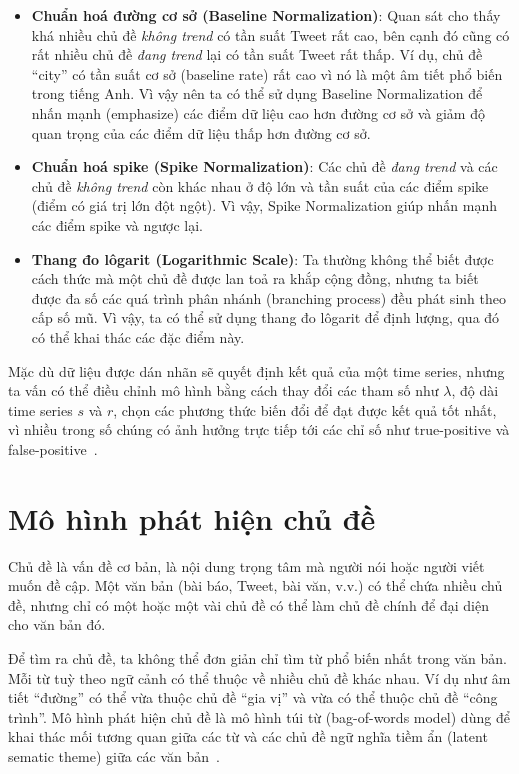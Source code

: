\begin{itemize}
	\item \textbf{Chuẩn hoá đường cơ sở (Baseline Normalization)}: Quan sát cho
		thấy khá nhiều chủ đề \textit{không trend} có tần suất Tweet rất cao,
		bên cạnh đó cũng có rất nhiều chủ đề \textit{đang trend} lại có tần
		suất Tweet rất thấp. Ví dụ, chủ đề ``city'' có tần suất cơ sở (baseline
		rate) rất cao vì nó là một âm tiết phổ biến trong tiếng Anh. Vì vậy nên
		ta có thể sử dụng Baseline Normalization để nhấn mạnh (emphasize) các
		điểm dữ liệu cao hơn đường cơ sở và giảm độ quan trọng của các điểm dữ
		liệu thấp hơn đường cơ sở.
	
	\item \textbf{Chuẩn hoá spike (Spike Normalization)}: Các chủ đề
		\textit{đang trend} và các chủ đề \textit{không trend} còn khác nhau ở
		độ lớn và tần suất của các điểm spike (điểm có giá trị lớn đột ngột).
		Vì vậy, Spike Normalization giúp nhấn mạnh các điểm spike và ngược lại.
	
	\item \textbf{Thang đo lôgarit (Logarithmic Scale)}: Ta thường không thể
		biết được cách thức mà một chủ đề được lan toả ra khắp cộng đồng, nhưng
		ta biết được đa số các quá trình phân nhánh (branching process) đều
		phát sinh theo cấp số mũ. Vì vậy, ta có thể sử dụng thang đo lôgarit để
		định lượng, qua đó có thể khai thác các đặc điểm này.

\end{itemize}

Mặc dù dữ liệu được dán nhãn sẽ quyết định kết quả của một time series, nhưng
ta vấn có thể điều chỉnh mô hình bằng cách thay đổi các tham số như $\lambda$,
độ dài time series $s$ và $r$, chọn các phương thức biến đổi để đạt được kết
quả tốt nhất, vì nhiều trong số chúng có ảnh hưởng trực tiếp tới các chỉ số như
true-positive và false-positive~\cite{hendricksonTrendDetectionSocial2015}.

\section{Mô hình phát hiện chủ đề}
Chủ đề là vấn đề cơ bản, là nội dung trọng tâm mà người nói hoặc người viết
muốn đề cập. Một văn bản (bài báo, Tweet, bài văn, v.v.) có thể chứa nhiều chủ
đề, nhưng chỉ có một hoặc một vài chủ đề có thể làm chủ đề chính để đại diện
cho văn bản đó.

Để tìm ra chủ đề, ta không thể đơn giản chỉ tìm từ phổ biến nhất trong văn bản.
Mỗi từ tuỳ theo ngữ cảnh có thể thuộc về nhiều chủ đề khác nhau. Ví dụ như âm
tiết ``đường'' có thể vừa thuộc chủ đề ``gia vị'' và vừa có thể thuộc chủ đề
``công trình''. Mô hình phát hiện chủ đề là mô hình túi từ (bag-of-words model)
dùng để khai thác mối tương quan giữa các từ và các chủ đề ngữ nghĩa tiềm ẩn
(latent sematic theme) giữa các văn
bản~\cite{madaniRealtimeTrendingTopics2015}.


